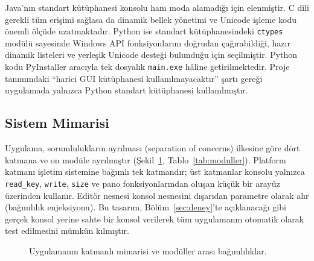 \documentclass[conference,a4paper]{IEEEtran}
\newcommand{\kod}[1]{\texttt{#1}}
\begin{document}
Java'nın standart kütüphanesi konsolu ham moda alamadığı için elenmiştir. C dili gerekli tüm erişimi sağlasa da dinamik bellek yönetimi ve Unicode işleme kodu önemli ölçüde uzatmaktadır. Python ise standart kütüphanesindeki \kod{ctypes} modülü \cite{pyctypes} sayesinde Windows API fonksiyonlarını doğrudan çağırabildiği, hazır dinamik listeleri ve yerleşik Unicode desteği bulunduğu için seçilmiştir. Python kodu PyInstaller \cite{pyinstaller} aracıyla tek dosyalık \kod{main.exe} hâline getirilmektedir. Proje tanımındaki ``harici GUI kütüphanesi kullanılmayacaktır'' şartı gereği uygulamada yalnızca Python standart kütüphanesi kullanılmıştır.

\subsection{Sistem Mimarisi}

Uygulama, sorumlulukların ayrılması (separation of concerns) ilkesine göre dört katmana ve on modüle ayrılmıştır (Şekil~\ref{fig:mimari}, Tablo~\ref{tab:moduller}). Platform katmanı işletim sistemine bağımlı tek katmandır; üst katmanlar konsolu yalnızca \kod{read\_key}, \kod{write}, \kod{size} ve pano fonksiyonlarından oluşan küçük bir arayüz üzerinden kullanır. Editör nesnesi konsol nesnesini dışarıdan parametre olarak alır (bağımlılık enjeksiyonu). Bu tasarım, Bölüm~\ref{sec:deney}'te açıklanacağı gibi gerçek konsol yerine sahte bir konsol verilerek tüm uygulamanın otomatik olarak test edilmesini mümkün kılmıştır.

\begin{figure}[t]
\centering
{}
\caption{Uygulamanın katmanlı mimarisi ve modüller arası bağımlılıklar.}
\label{fig:mimari}
\end{figure}
\end{document}
